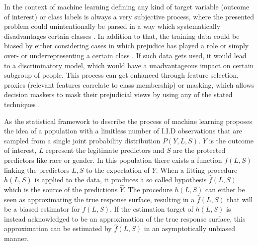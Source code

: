 In the context of machine learning defining any kind of target variable (outcome of interest) or class labels is always a very subjective process, where 
the presented problem could unintentionally be parsed in a way which systematically disadvantages 
certain classes \cite{Barocas.2016, barocas-hardt-narayanan}. In addition to that, the training data could be biased by 
either considering cases in which prejudice has played a role or simply over- or underrepresenting 
a certain class \cite{Barocas.2016, barocas-hardt-narayanan}. If such data gets used, it would lead to a discriminatory model, which would have a unadvantageous impact on certain subgroup of people. This process can get enhanced through feature selection, proxies (relevant features correlate to class membership) or masking, which allows decision maskers to mask their prejudicial views by using any of the stated techniques \cite{Barocas.2016}.  

As the statistical framework to describe the process of machine learning \cite{Berk.2018} 
proposes the idea of a population with a limitless number of I.I.D observations that are 
sampled from a single joint probability distribution $P(Y,L,S)$. 
$Y$ is the outcome of interest, $L$ represent the legitimate predictors and $S$ are the 
protected predictors like race or gender. In this population there exists a function $f(L,S)$ 
linking the predictors $L,S$ to the expectation of $Y$. When a fitting procedure $h(L,S)$ 
is applied to the data, it produces a so called hypothesis $\hat{f}(L,S)$ which is the 
source of the predictions $\hat{Y}$. The procedure $h(L,S)$ can either be seen as 
approximating the true response surface, resulting in a $\hat{f}(L,S)$ that will be a biased 
estimator for $f(L,S)$. If the estimation target of $h(L,S)$ is instead acknowledged to be 
an approximation of the true response surface, this approximation can be estimated by 
$\hat{f}(L,S)$ in an asymptotically unbiased manner.